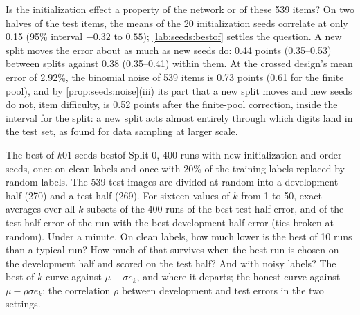\begin{refsection}
Is the initialization effect a property of the network or of these 539 items? On two halves of the test items, the means of the 20 initialization seeds correlate at only 0.15 (95\% interval $-0.32$ to $0.55$); \cref{lab:seeds:bestof} settles the question. A new split moves the error about as much as new seeds do: 0.44 points (0.35--0.53) between splits against 0.38 (0.35--0.41) within them. At the crossed design's mean error of 2.92\%, the binomial noise of 539 items is 0.73 points (0.61 for the finite pool), and by \cref{prop:seeds:noise}(iii) its part that a new split moves and new seeds do not, item difficulty, is 0.52 points after the finite-pool correction, inside the interval for the split: a new split acts almost entirely through which digits land in the test set, as \textcite{BouthillierEtAl2021} found for data sampling at larger scale.

\begin{lab}{The best of $k$}{01-seeds-bestof}\label{lab:seeds:bestof}
 Split 0, 400 runs with new initialization and order seeds, once on clean labels and once with 20\% of the training labels replaced by random labels. The 539 test images are divided at random into a development half (270) and a test half (269). For sixteen values of $k$ from 1 to 50, exact averages over all $k$-subsets of the 400 runs of the best test-half error, and of the test-half error of the run with the best development-half error (ties broken at random). Under a minute.
 On clean labels, how much lower is the best of 10 runs than a typical run? How much of that survives when the best run is chosen on the development half and scored on the test half? And with noisy labels?
 The best-of-$k$ curve against $\mu-\sigma e_k$, and where it departs; the honest curve against $\mu-\rho\sigma e_k$; the correlation $\rho$ between development and test errors in the two settings.
\end{lab}


\end{refsection}
